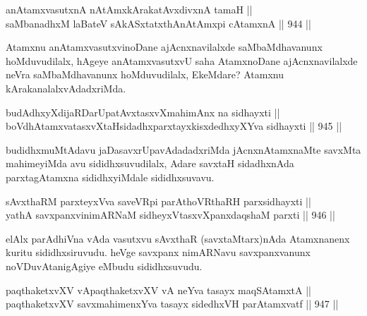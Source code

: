\begin{shl}
anAtamxvasutxnA nA\s \s tAmx\s kArakatAvxdivxnA tamaH || \\
saMbanadhxM laBateV sAkASxtatxthA\s nAtAmx\s pi cA\s \s tamxnA ||  944 ||  
\end{shl}

\begin{artha}
Atamxnu anAtamxvasutxvinoDane ajAcnxnavilalxde saMbaMdhavanunx hoMduvudilalx, hAgeye anAtamxvasutxvU saha AtamxnoDane ajAcnxnavilalxde neVra saMbaMdhavanunx hoMduvudilalx, EkeMdare? Atamxnu kArakanalalxvAdadxriMda.
\end{artha}


\begin{shl}
\footnotemark[1]budAdhxyXdijaRDarUpatAvxtasxvXmahimAnx na sidhayxti || \\
boVdhAtamxvatasxvXtaHsidadhxparxtayxkisxdedhxyXYva sidhayxti ||  945 ||  
\end{shl}

\begin{artha}
budidhxmuMtAdavu jaDasavxrUpavAdadadxriMda jAcnxnAtamxnaMte savxMta mahimeyiMda avu sididhxsuvudilalx, Adare savxtaH sidadhxnAda parxtagAtamxna sididhxyiMdale sididhxsuvavu.
\end{artha}


\begin{shl}
sAvxthaRM parxteyxVva saveVR\s pi parAthoVR\s thaRH parxsidhayxti || \\
yathA savxpanxvinimARNaM sidheyxVtasxvXpanxdaqshaM parxti ||  946 ||  
\end{shl}

\begin{artha}
elAlx parAdhiVna vAda vasutxvu sAvxthaR (savxtaMtarx)nAda Atamxnanenx kuritu sididhxsiruvudu. heVge savxpanx nimARNavu savxpanxvanunx noVDuvAtanigAgiye eMbudu sididhxsuvudu.
\end{artha}


\begin{shl}
paqthaketxvXV vA\s paqthaketxvXV vA neYva tasayx maqSAtamxtA || \\
paqthaketxvXV savxmahimenxYva tasayx sidedhxVH parAtamxvatf ||  947 ||  
\end{shl}

